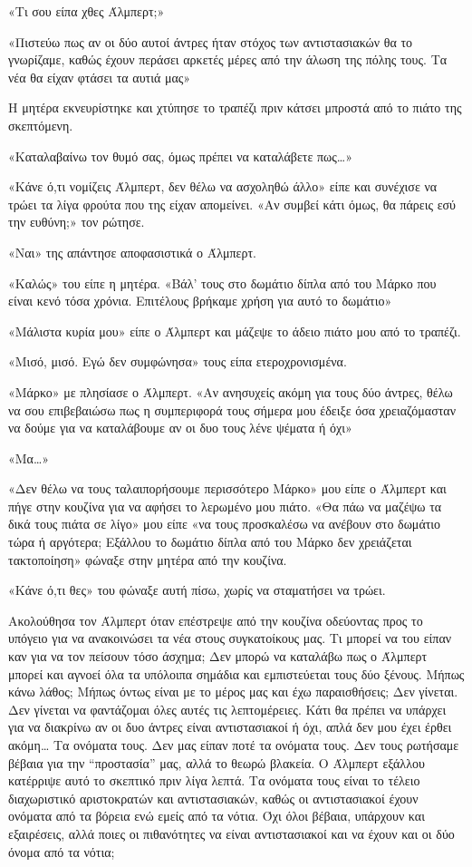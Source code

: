 \documentclass[12pt,twoside, openany]{book}
\begin{document}
«Τι σου είπα χθες Άλμπερτ;»

«Πιστεύω πως αν οι δύο αυτοί άντρες ήταν στόχος των αντιστασιακών θα το γνωρίζαμε, καθώς έχουν περάσει αρκετές μέρες από την άλωση της πόλης τους. Τα νέα θα είχαν φτάσει τα αυτιά μας»

Η μητέρα εκνευρίστηκε και χτύπησε το τραπέζι πριν κάτσει μπροστά από το πιάτο της σκεπτόμενη.

«Καταλαβαίνω τον θυμό σας, όμως πρέπει να καταλάβετε πως…»

«Κάνε ό,τι νομίζεις Άλμπερτ, δεν θέλω να ασχοληθώ άλλο» είπε και συνέχισε να τρώει τα λίγα φρούτα που της είχαν απομείνει. «Αν συμβεί κάτι όμως, θα πάρεις εσύ την ευθύνη;» τον ρώτησε.

«Ναι» της απάντησε αποφασιστικά ο Άλμπερτ.

«Καλώς» του είπε η μητέρα. «Βάλ’ τους στο δωμάτιο δίπλα από του Μάρκο που είναι κενό τόσα χρόνια. Επιτέλους βρήκαμε χρήση για αυτό το δωμάτιο»

«Μάλιστα κυρία μου» είπε ο Άλμπερτ και μάζεψε το άδειο πιάτο μου από το τραπέζι.

«Μισό, μισό. Εγώ δεν συμφώνησα» τους είπα ετεροχρονισμένα.

«Μάρκο» με πλησίασε ο Άλμπερτ. «Αν ανησυχείς ακόμη για τους δύο άντρες, θέλω να σου επιβεβαιώσω πως η συμπεριφορά τους σήμερα μου έδειξε όσα χρειαζόμασταν να δούμε για να καταλάβουμε αν οι δυο τους λένε ψέματα ή όχι»

«Μα…»

«Δεν θέλω να τους ταλαιπορήσουμε περισσότερο Μάρκο» μου είπε ο Άλμπερτ και πήγε στην κουζίνα για να αφήσει το λερωμένο μου πιάτο. «Θα πάω να μαζέψω τα δικά τους πιάτα σε λίγο» μου είπε «να τους προσκαλέσω να ανέβουν στο δωμάτιο τώρα ή αργότερα; Εξάλλου το δωμάτιο δίπλα από του Μάρκο δεν χρειάζεται τακτοποίηση» φώναξε στην μητέρα από την κουζίνα.

«Κάνε ό,τι θες» του φώναξε αυτή πίσω, χωρίς να σταματήσει να τρώει.

Ακολούθησα τον Άλμπερτ όταν επέστρεψε από την κουζίνα οδεύοντας προς το υπόγειο για να ανακοινώσει τα νέα στους συγκατοίκους μας. Τι μπορεί να του είπαν καν για να τον πείσουν τόσο άσχημα; Δεν μπορώ να καταλάβω πως ο Άλμπερτ μπορεί και αγνοεί όλα τα υπόλοιπα σημάδια και εμπιστεύεται τους δύο ξένους. Μήπως κάνω λάθος; Μήπως όντως είναι με το μέρος μας και έχω παραισθήσεις; Δεν γίνεται. Δεν γίνεται να φαντάζομαι όλες αυτές τις λεπτομέρειες. Κάτι θα πρέπει να υπάρχει για να διακρίνω αν οι δυο άντρες είναι αντιστασιακοί ή όχι, απλά δεν μου έχει έρθει ακόμη… Τα ονόματα τους. Δεν μας είπαν ποτέ τα ονόματα τους. Δεν τους ρωτήσαμε βέβαια για την “προστασία” μας, αλλά το θεωρώ βλακεία. Ο Άλμπερτ εξάλλου κατέρριψε αυτό το σκεπτικό πριν λίγα λεπτά. Τα ονόματα τους είναι το τέλειο διαχωριστικό αριστοκρατών και αντιστασιακών, καθώς οι αντιστασιακοί έχουν ονόματα από τα βόρεια ενώ εμείς από τα νότια. Όχι όλοι βέβαια, υπάρχουν και εξαιρέσεις, αλλά ποιες οι πιθανότητες να είναι αντιστασιακοί και να έχουν και οι δύο όνομα από τα νότια;
\end{document}
